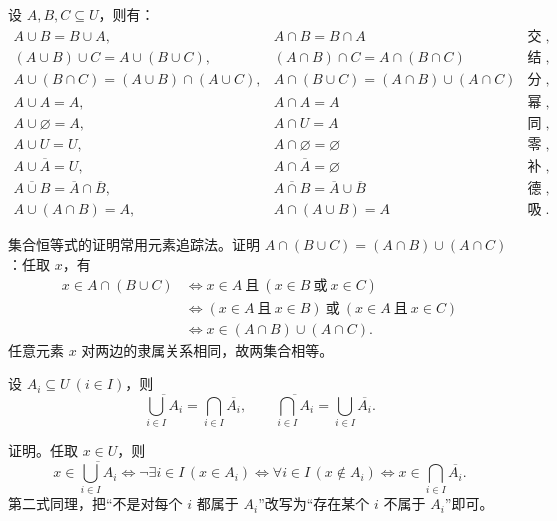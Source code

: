 \begin{theorem}[集合运算律]\label{ch1-set-laws}
设 $A,B,C\subseteq U$，则有：
\[
\begin{array}{lll}
A\cup B=B\cup A, & A\cap B=B\cap A & \text{交换律},\\
(A\cup B)\cup C=A\cup(B\cup C), & (A\cap B)\cap C=A\cap(B\cap C) & \text{结合律},\\
A\cup(B\cap C)=(A\cup B)\cap(A\cup C), &
A\cap(B\cup C)=(A\cap B)\cup(A\cap C) & \text{分配律},\\
A\cup A=A, & A\cap A=A & \text{幂等律},\\
A\cup\varnothing=A, & A\cap U=A & \text{同一律},\\
A\cup U=U, & A\cap\varnothing=\varnothing & \text{零一律},\\
A\cup\overline A=U, & A\cap\overline A=\varnothing & \text{补元律},\\
\overline{A\cup B}=\overline A\cap\overline B, &
\overline{A\cap B}=\overline A\cup\overline B & \text{德摩根律},\\
A\cup(A\cap B)=A, & A\cap(A\cup B)=A & \text{吸收律}.
\end{array}
\]
\end{theorem}

集合恒等式的证明常用元素追踪法。证明 $A\cap(B\cup C)=(A\cap B)\cup(A\cap C)$：任取 $x$，有
\[
\begin{aligned}
x\in A\cap(B\cup C)
&\Longleftrightarrow x\in A\ \text{且}\ (x\in B\ \text{或}\ x\in C)\\
&\Longleftrightarrow (x\in A\ \text{且}\ x\in B)\ \text{或}\ (x\in A\ \text{且}\ x\in C)\\
&\Longleftrightarrow x\in(A\cap B)\cup(A\cap C).
\end{aligned}
\]
任意元素 $x$ 对两边的隶属关系相同，故两集合相等。

\begin{theorem}[广义德摩根律]\label{ch1-general-demorgan}
设 $A_i\subseteq U\ (i\in I)$，则
\[
  \overline{\bigcup_{i\in I}A_i}=\bigcap_{i\in I}\overline{A_i},
  \qquad
  \overline{\bigcap_{i\in I}A_i}=\bigcup_{i\in I}\overline{A_i}.
\]
\end{theorem}

证明。任取 $x\in U$，则
\[
x\in\overline{\bigcup_{i\in I}A_i}
\Longleftrightarrow \neg\exists i\in I\,(x\in A_i)
\Longleftrightarrow \forall i\in I\,(x\notin A_i)
\Longleftrightarrow x\in\bigcap_{i\in I}\overline{A_i}.
\]
第二式同理，把“不是对每个 $i$ 都属于 $A_i$”改写为“存在某个 $i$ 不属于 $A_i$”即可。

